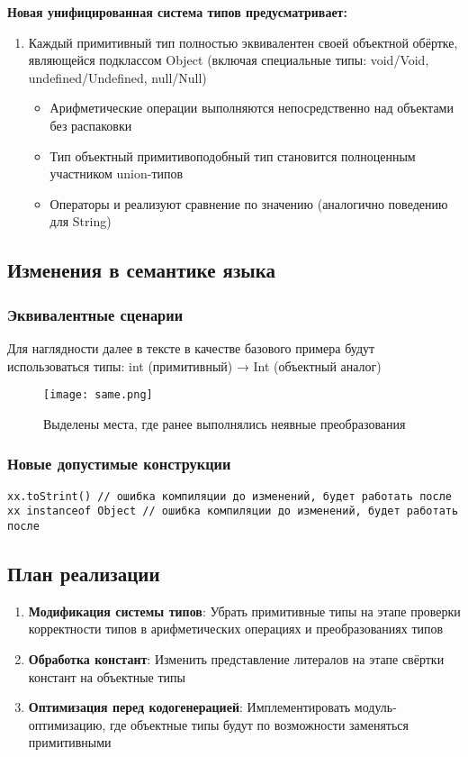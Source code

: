\textbf{Новая унифицированная система типов предусматривает:}
\begin{enumerate}[leftmargin=*]
    \item Каждый примитивный тип полностью эквивалентен своей объектной обёртке, являющейся подклассом Object
    (включая специальные типы: void/Void, undefined/Undefined, null/Null)
    \begin{itemize}[label={--}]
        \item Арифметические операции выполняются непосредственно над объектами без распаковки
        \item Тип объектный примитивоподобный тип становится полноценным участником union-типов
        \item Операторы \code{==} и \code{===} реализуют сравнение по значению (аналогично поведению для String)
    \end{itemize}

\end{enumerate}

\subsection{Изменения в семантике языка}
\subsubsection{Эквивалентные сценарии}
Для наглядности далее в тексте в качестве базового примера будут использоваться типы:
int (примитивный) → Int (объектный аналог)
\begin{figure}[H]
    \centering
    \texttt{[image: same.png]}
    \caption{Выделены места, где ранее выполнялись неявные преобразования}
    \label{fig:example}
\end{figure}

\subsubsection{Новые допустимые конструкции}

\begin{lstlisting}
xx.toStrint() // ошибка компиляции до изменений, будет работать после
xx instanceof Object // ошибка компиляции до изменений, будет работать после
\end{lstlisting}


\subsection{План реализации}
\begin{enumerate}
    \item \textbf{Модификация системы типов}: Убрать примитивные типы на этапе проверки корректности типов в арифметических операциях и преобразованиях типов
    \item \textbf{Обработка констант}: Изменить представление литералов на этапе свёртки констант на объектные типы
    \item \textbf{Оптимизация перед кодогенерацией}: Имплементировать модуль-оптимизацию, где объектные типы будут по возможности заменяться примитивными
\end{enumerate}

\newpage